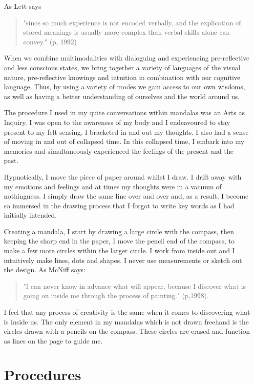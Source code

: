 As Lett says 
\begin{quote}"since so much experience is not encoded verbally, and the explication of stored meanings is usually more complex than verbal skills alone can convey." (p, 1992) 
\end{quote}

When we combine multimodalities with dialoguing and experiencing pre-reflective and less conscious states, we bring together a variety of languages of the visual nature, pre-reflective knowings and intuition in combination with our cognitive language. Thus, by using a variety of modes we gain access to our own wisdoms, as well as having a better understanding of ourselves and the world around us. 

The procedure I used in my quite conversations within mandalas was an Arts as Inquiry. I was open to the awareness of my body and I endeavoured to stay present to my felt sensing. I bracketed in and out my thoughts. I also had a sense of moving in and out of collapsed time. In this collapsed time, I embark into my memories and simultaneously experienced the feelings of the present and the past. 

Hypnotically, I move the piece of paper around whilst I draw. I drift away with my emotions and feelings and at times my thoughts were in a vacuum of nothingness. I simply draw the same line over and over and, as a result, I become so immersed in the drawing process that I forgot to write key words as I had initially intended. 

Creating a mandala, I start by drawing a large circle with the compass, then keeping the sharp end in the paper, I move the pencil end of the compass, to make a few more circles within the larger circle.  I work from inside out and I intuitively make lines, dots and shapes. I never use measurements or sketch out the design. As McNiff says:\begin{quote} "I can never know in advance what will appear, because I discover what is going on inside me through the process of painting." (p,1998). \end{quote}

I feel that any process of creativity is the same when it comes to discovering what is inside us. The only element in my mandalas which is not drawn freehand is the circles drawn with a pencils on the compass. These circles are erased and function as lines on the page to guide me.  


\section{Procedures}


